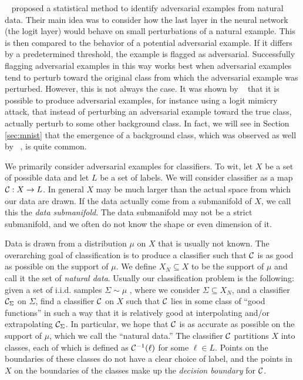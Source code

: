 ~\citet{roth19aodds} proposed a statistical method to identify adversarial examples from natural data. Their main idea was to consider how the last layer in the neural network (the logit layer) would behave on small perturbations of a natural example. %
This is then compared to the behavior of a potential adversarial example. If it differs by a predetermined threshold, the example is flagged as adversarial. Successfully flagging adversarial examples in this way works best when adversarial examples tend to perturb toward the original class from which the adversarial example was perturbed. However, this is not always the case.
It was shown by ~\citet{hosseini2019odds} that it is possible to produce adversarial examples, for instance using a logit mimicry attack, that instead of perturbing an adversarial example toward the true class, actually perturb to some other background class. In fact, we will see in Section \ref{sec:mnist} that the emergence of a background class, which was observed as well by ~\citet{roth19aodds}, is quite common. 

We primarily consider adversarial examples for classifiers.  To wit, let $X$ be a set of possible data and let $L$ be a set of labels. We will consider classifier as a map $\mathcal{C}: X \to L$. In general $X$ may be much larger than the actual space from which our data are drawn. If the data actually come from a submanifold of $X$, we call this the \emph{data submanifold}. The data submanifold may not be a strict submanifold, and we often do not know the shape or even dimension of it.

Data is drawn from a distribution $\mu$ on $X$ that is usually not known. The overarching goal of classification is to produce a classifier such that $\mathcal{C}$ is as good as possible on the support of $\mu$. 
We define $X_N \subseteq X$ to be the support of $\mu$ and call it the set of \emph{natural data}. 
Usually our classification problem is the following: given a set of i.i.d. samples $\Sigma \sim \mu$
, where we consider $\Sigma \subseteq X_N$, 
and a classifier $\mathcal{C}_\Sigma$ on $\Sigma$, find a classifier $\mathcal{C}$ on $X$ such that $\mathcal{C}$ lies in some class of ``good functions'' in such a way that it is relatively good at interpolating and/or extrapolating $\mathcal{C}_\Sigma$. In particular, we hope that $\mathcal{C}$ is as accurate as possible on the support of $\mu$, which we call the ``natural data.'' %
The classifier $\mathcal{C}$ partitions $X$ into classes, each of which is defined as $\mathcal{C}^{-1}(\ell)$ for some $\ell \in L$. Points on the boundaries of these classes do not have a clear choice of label, and the points in $X$ on the boundaries of the classes make up the \emph{decision boundary} for $\mathcal{C}$.

